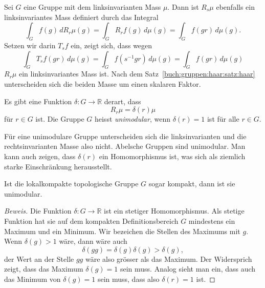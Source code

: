 Sei $G$ eine Gruppe mit dem linksinvarianten Mass $\mu$.
Dann ist $R_s\mu$ ebenfalls ein linksinvariantes Mass definiert
durch das Integral
\[
\int_G f(g) \, dR_r\mu(g)
=
\int_G R_rf(g) \,d\mu(g)
=
\int_G f(gr)\,d\mu(g).
\]
Setzen wir darin $T_sf$ ein, zeigt sich, dass wegen
\[
\int_G T_sf(gr)\,d\mu(g)
=
\int_G f(s^{-1}gr)\,d\mu(g)
=
\int_G f(gr)\,d\mu(g)
\]
$R_r\mu$ ein linksinvariantes Mass ist.
Nach dem Satz~\ref{buch:gruppen:haar:satz:haar} unterscheiden sich
die beiden Masse um einen skalaren Faktor.

\begin{definition}
Es gibt eine Funktion $\delta\colon G\to \mathbb{R}$ derart, dass
\[
R_r \mu = \delta(r) \mu
\]
für $r\in G$
ist.
Die Gruppe $G$ heisst {\em unimodular}, wenn $\delta(r)=1$ ist für
alle $r\in G$.
\end{definition}

Für eine unimodulare Gruppe unterscheiden sich die linksinvarianten
und die rechtsinvarianten Masse also nicht.
Abelsche Gruppen sind unimodular.
Man kann auch zeigen, dass $\delta(r)$ ein Homomorphismus ist,
was sich als ziemlich starke Einschränkung herausstellt.

\begin{satz}
Ist die lokalkompakte topologische Gruppe $G$ sogar kompakt, dann ist
sie unimodular.
\end{satz}

\begin{proof}[Beweis]
Die Funktion $\delta\colon G\to\mathbb{R}$ ist ein stetiger Homomorphismus.
Als stetige Funktion hat sie auf dem kompakten Definitionsbereich $G$
mindestens ein Maximum und ein Minimum.
Wir bezeichen die Stellen des Maximums mit $g$.
Wenn $\delta(g)>1$ wäre, dann wäre auch
\[
\delta(gg)
=
\delta(g)
\delta(g)
>
\delta(g),
\]
der Wert an  der Stelle $gg$ wäre also grösser als das Maximum.
Der Widersprich zeigt, dass das Maximum $\delta(g)=1$ sein muss.
Analog sieht man ein, dass auch das Minimum von $\delta(g)=1$
sein muss, dass also $\delta(r)=1$ ist.
\end{proof}

